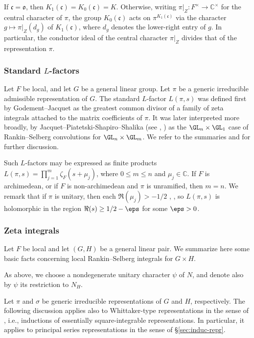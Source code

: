 If $\mathfrak{c} = \mathfrak{o}$, then $K_1(\mathfrak{c}) = K_0(\mathfrak{c}) = K$.  Otherwise, writing $\pi|_Z : F^\times \rightarrow \mathbb{C}^\times$ for the central character of $\pi$, the group $K_0(\mathfrak{c})$ acts on $\pi^{K_1(\mathfrak{c})}$ via the character $g \mapsto \pi|_Z(d_g)$ of $K_1(\mathfrak{c})$, where $d_g$ denotes the lower-right entry of $g$.  In particular, the conductor ideal of the central character $\pi|_Z$ divides that of the representation $\pi$.

\subsubsection{Standard $L$-factors}\label{sec:standard-l-factors}
Let $F$ be local, and let $G$ be a general linear group.  Let $\pi$ be a generic irreducible admissible representation of $G$.  The standard $L$-factor $L(\pi,s)$ was defined first by Godement--Jacquet \cite{MR0342495} as the greatest common divisor of a family of zeta integrals attached to the matrix coefficients of $\pi$.  It was later interpreted more broadly, by Jacquet--Piatetski-Shapiro--Shalika (see \cite[\S5.1]{MR701565}, \cite[Thm 4.3]{MR519356}) as the $\GL_n \times \GL_1$ case of Rankin--Selberg convolutions for $\GL_n \times \GL_m$.  We refer to the summaries \cite{MR546609} and \cite[\S2 and Appendix]{MR1395406} for further discussion.

Such $L$-factors may be expressed as finite products $L(\pi,s) = \prod_{j=1}^m \zeta_F(s + \mu_{j})$, where $0 \leq m \leq n$ and $\mu_j \in \mathbb{C}$.  If $F$ is archimedean, or if $F$ is non-archimedean and $\pi$ is unramified, then $m = n$.  We remark that if $\pi$ is unitary, then each $\Re(\mu_j) > -1/2$ \cite[\S2.5]{MR618323}, \cite[Prop 2.1]{MR1277950}, so $L(\pi,s)$ is holomorphic in the region $\Re(s) \geq 1/2-\eps$ for some $\eps > 0$.


\subsubsection{Zeta integrals}\label{sec:zeta-integrals}
Let $F$ be local and let $(G,H)$ be a general linear pair.  We summarize here some basic facts concerning local Rankin--Selberg integrals for $G \times H$.

As above, we choose a nondegenerate unitary character $\psi$ of $N$, and denote also by $\psi$ its restriction to $N_H$.

Let $\pi$ and $\sigma$ be generic irreducible representations of $G$ and $H$, respectively.  The following discussion applies also to
Whittaker-type representations in the sense of \cite[\S1.5]{MR3753910}, i.e., inductions of essentially square-integrable representations.  In particular, it applies to principal series representations in the sense of \S\ref{sec:induc-repr}.


